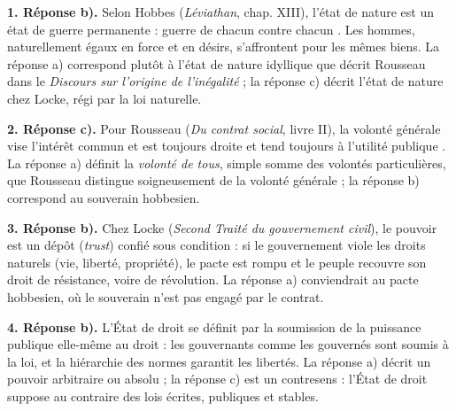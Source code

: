 \documentclass[11pt]{article}
\begin{document}
\begin{corrige}

\textbf{1. Réponse b).} Selon Hobbes (\emph{Léviathan}, chap. XIII), l'état de nature est un état de guerre permanente : \guillemotleft guerre de chacun contre chacun \guillemotright. Les hommes, naturellement égaux en force et en désirs, s'affrontent pour les mêmes biens. La réponse a) correspond plutôt à l'état de nature idyllique que décrit Rousseau dans le \emph{Discours sur l'origine de l'inégalité} ; la réponse c) décrit l'état de nature chez Locke, régi par la loi naturelle.

\textbf{2. Réponse c).} Pour Rousseau (\emph{Du contrat social}, livre II), la volonté générale vise l'intérêt commun et est \guillemotleft toujours droite et tend toujours à l'utilité publique \guillemotright. La réponse a) définit la \emph{volonté de tous}, simple somme des volontés particulières, que Rousseau distingue soigneusement de la volonté générale ; la réponse b) correspond au souverain hobbesien.

\textbf{3. Réponse b).} Chez Locke (\emph{Second Traité du gouvernement civil}), le pouvoir est un dépôt (\emph{trust}) confié sous condition : si le gouvernement viole les droits naturels (vie, liberté, propriété), le pacte est rompu et le peuple recouvre son droit de résistance, voire de révolution. La réponse a) conviendrait au pacte hobbesien, où le souverain n'est pas engagé par le contrat.

\textbf{4. Réponse b).} L'État de droit se définit par la soumission de la puissance publique elle-même au droit : les gouvernants comme les gouvernés sont soumis à la loi, et la hiérarchie des normes garantit les libertés. La réponse a) décrit un pouvoir arbitraire ou absolu ; la réponse c) est un contresens : l'État de droit suppose au contraire des lois écrites, publiques et stables.

\end{corrige}
\end{document}
